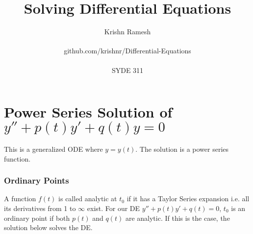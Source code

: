 \documentclass[11pt]{article}
\begin{document}
\title{Solving Differential Equations}
\author{
    Krishn Ramesh \\ \\
    github.com/krishnr/Differential-Equations \\ \\
    SYDE 311
}
\maketitle



\section{Power Series Solution of $y''+p(t)y'+q(t)y=0$}

This is a generalized ODE where $y=y(t)$. The solution is a power series function.

\subsubsection*{Ordinary Points}
A function $f(t)$ is called analytic at $t_0$ if it has a Taylor Series expansion i.e. all its derivatives from 1 to $\infty$ exist. For our DE $y''+p(t)y' +q(t) = 0$, $t_0$ is an ordinary point if both $p(t)$ and $q(t)$ are analytic. If this is the case, the solution below solves the DE.
\end{document}
